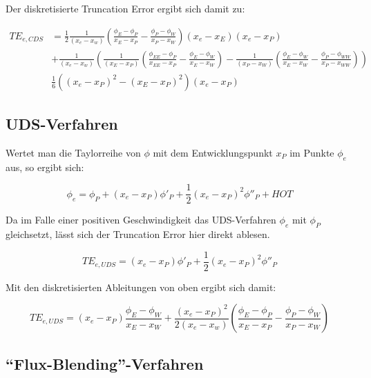 \documentclass[10pt, ngerman,colorback,accentcolor=tud2d]{tudreport}
\begin{document}
Der diskretisierte Truncation Error ergibt sich damit zu:

\begin{align}
  TE_{e, CDS} &=  \frac{1}{2} \frac{1}{(x_e-x_w)} \left({\frac{\phi_E-\phi_P}{x_E-x_P}
  - \frac{\phi_P-\phi_W}{x_P-x_W} }\right) (x_e-x_E)(x_e-x_P) \nonumber \\
  &+
 \frac{1}{(x_e-x_w)} \left({
  \frac{1}{(x_E-x_P)} \left({\frac{\phi_{EE}-\phi_P}{x_{EE}-x_P}- \frac{\phi_E-\phi_W}{x_E-x_W} }\right)-
  \frac{1}{(x_P-x_W)} \left({\frac{\phi_E-\phi_W}{x_E-x_W} - \frac{\phi_P-\phi_{WW}}{x_P-x_{WW}} }\right)
  }\right) \nonumber \\
  &\frac{1}{6} \left({(x_e-x_P)^2-(x_E-x_P)^2}\right)(x_e-x_P)
\end{align}




\subsection{UDS-Verfahren}

Wertet man die Taylorreihe von $\phi$ mit dem Entwicklungspunkt $x_P$ im Punkte $\phi_e$
aus, so ergibt sich:

\begin{equation*}
  \phi_e = \phi_P +(x_e-x_P) \phi'_P + \frac{1}{2} (x_e-x_P)^2 \phi''_P+HOT
\end{equation*}

Da im Falle einer positiven Geschwindigkeit das UDS-Verfahren $\phi_e$ mit $\phi_P$
gleichsetzt, lässt sich der Truncation Error hier direkt ablesen.

\begin{equation*}
  TE_{e, UDS} = (x_e-x_P) \phi'_P + \frac{1}{2} (x_e-x_P)^2 \phi''_P
\end{equation*}

Mit den diskretisierten Ableitungen von oben ergibt sich damit:

\begin{equation}
  TE_{e, UDS} = (x_e-x_P) \frac{\phi_E-\phi_W}{x_E-x_W}+
  \frac{(x_e-x_P)^2}{2(x_e-x_w)} \left({\frac{\phi_E-\phi_P}{x_E-x_P}
  - \frac{\phi_P-\phi_W}{x_P-x_W} }\right)
\end{equation}



\subsection{``Flux-Blending''-Verfahren}
\end{document}
